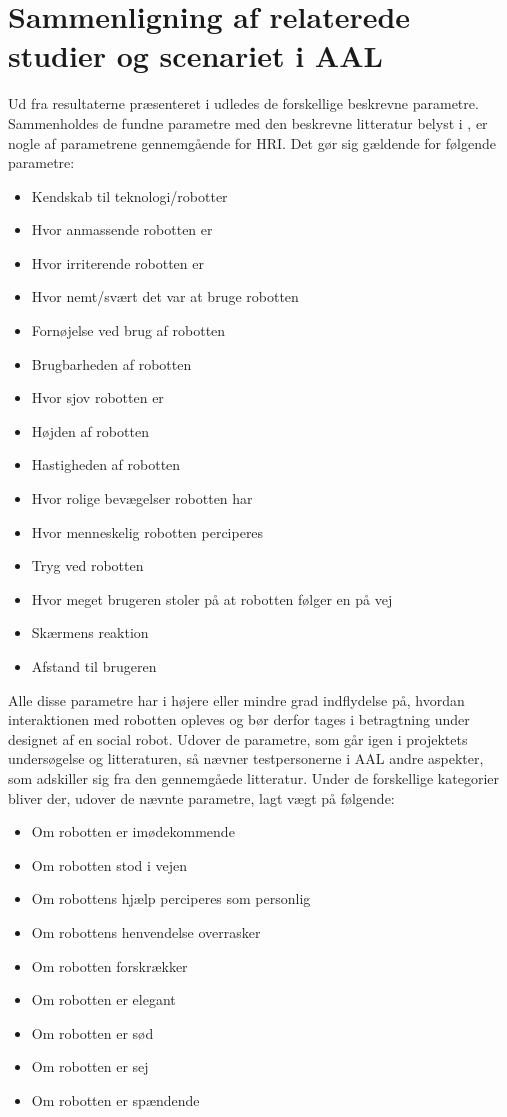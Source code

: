 \section{Sammenligning af relaterede studier og scenariet i AAL}
\label{ParametreTidligereStudier}
%
Ud fra resultaterne præsenteret i  udledes de forskellige beskrevne parametre. Sammenholdes de fundne parametre med den beskrevne litteratur belyst i , er nogle af parametrene gennemgående for HRI. Det gør sig gældende for følgende parametre:
%
\begin{multicols}{2}
	\begin{itemize}
		\item Kendskab til teknologi/robotter
		\item Hvor anmassende robotten er
		\item Hvor irriterende robotten er
		\item Hvor nemt/svært det var at bruge robotten
		\item Fornøjelse ved brug af robotten
		\item Brugbarheden af robotten
		\item Hvor sjov robotten er
		\item Højden af robotten
		\item Hastigheden af robotten
		\item Hvor rolige bevægelser robotten har
		\item Hvor menneskelig robotten perciperes
		\item Tryg ved robotten
		\item Hvor meget brugeren stoler på at robotten følger en på vej
		\item Skærmens reaktion
		\item Afstand til brugeren
	\end{itemize}
\end{multicols}
\noindent
%
Alle disse parametre har i højere eller mindre grad indflydelse på, hvordan interaktionen med robotten opleves og bør derfor tages i betragtning under designet af en social robot. \blankline
%
Udover de parametre, som går igen i projektets undersøgelse og litteraturen, så nævner testpersonerne i AAL andre aspekter, som adskiller sig fra den gennemgåede litteratur. Under de forskellige kategorier bliver der, udover de nævnte parametre, lagt vægt på følgende:
%
\begin{multicols}{2}
	\begin{itemize}
		\item Om robotten er imødekommende
		\item Om robotten stod i vejen
		\item Om robottens hjælp perciperes som personlig
		\item Om robottens henvendelse overrasker
		\item Om robotten forskrækker
		\item Om robotten er elegant
		\item Om robotten er sød
		\item Om robotten er sej
		\item Om robotten er spændende
	\end{itemize}
\end{multicols}
